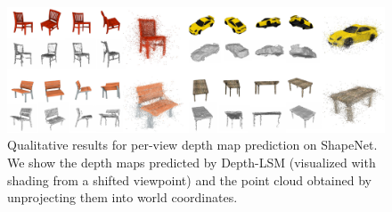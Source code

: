 \begin{figure}
\includegraphics[width=\linewidth]{figures/lsm/depth_results.pdf}
\caption{Qualitative results for per-view depth map prediction on ShapeNet. We show the depth maps predicted by Depth-LSM (visualized with shading from a shifted viewpoint) and the point cloud obtained by unprojecting them into world coordinates.}
\end{figure}